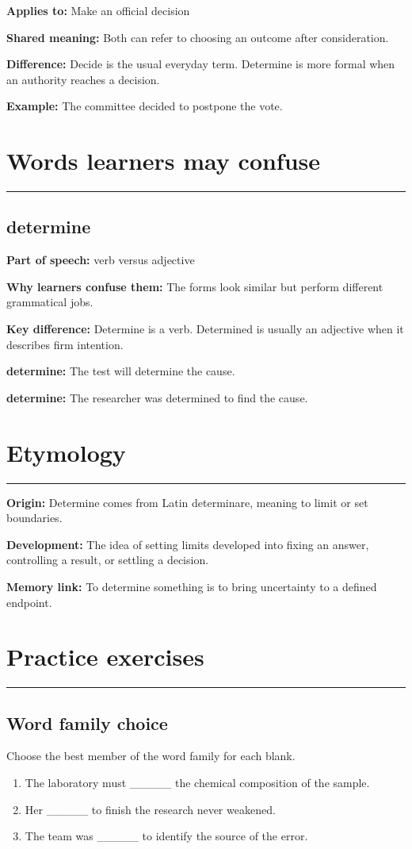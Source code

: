 \documentclass[11pt]{article}
\newcommand{\sectionrule}{\par\vspace{-0.5em}\noindent\textcolor{Accent}{\rule{\linewidth}{0.6pt}}\par}
\begin{document}
\textbf{Applies to:} Make an official decision

\textbf{Shared meaning:} Both can refer to choosing an outcome after consideration.

\textbf{Difference:} Decide is the usual everyday term. Determine is more formal when an authority reaches a decision.

\textbf{Example:} The committee decided to postpone the vote.

\section{Words learners may confuse}
\sectionrule
\subsection{determine}
\textbf{Part of speech:} verb versus adjective

\textbf{Why learners confuse them:} The forms look similar but perform different grammatical jobs.

\textbf{Key difference:} Determine is a verb. Determined is usually an adjective when it describes firm intention.

\textbf{determine:} The test will determine the cause.

\textbf{determine:} The researcher was determined to find the cause.

\section{Etymology}
\sectionrule
\textbf{Origin:} Determine comes from Latin determinare, meaning to limit or set boundaries.

\textbf{Development:} The idea of setting limits developed into fixing an answer, controlling a result, or settling a decision.

\textbf{Memory link:} To determine something is to bring uncertainty to a defined endpoint.

\section{Practice exercises}
\sectionrule
\subsection{Word family choice}
Choose the best member of the word family for each blank.

\begin{enumerate}
  \item The laboratory must \_\_\_\_\_ the chemical composition of the sample.
  \item Her \_\_\_\_\_ to finish the research never weakened.
  \item The team was \_\_\_\_\_ to identify the source of the error.
\end{enumerate}
\end{document}
